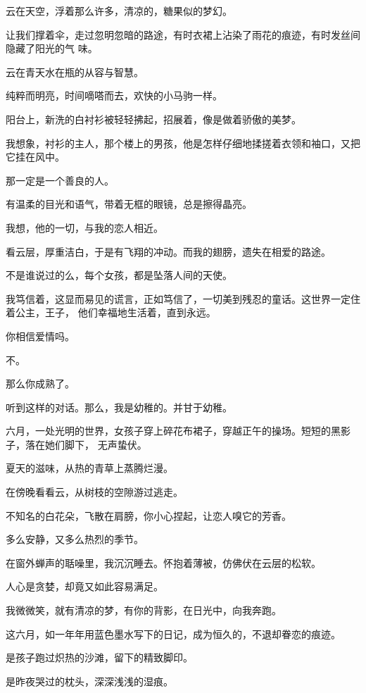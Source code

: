 		云在天空，浮着那么许多，清凉的，糖果似的梦幻。

		让我们撑着伞，走过忽明忽暗的路途，有时衣裙上沾染了雨花的痕迹，有时发丝间隐藏了阳光的气
	味。

		云在青天水在瓶的从容与智慧。

		纯粹而明亮，时间嘀嗒而去，欢快的小马驹一样。

		阳台上，新洗的白衬衫被轻轻拂起，招展着，像是做着骄傲的美梦。

		我想象，衬衫的主人，那个楼上的男孩，他是怎样仔细地揉搓着衣领和袖口，又把它挂在风中。

		那一定是一个善良的人。

		有温柔的目光和语气，带着无框的眼镜，总是擦得晶亮。

		我想，他的一切，与我的恋人相近。


		看云层，厚重洁白，于是有飞翔的冲动。而我的翅膀，遗失在相爱的路途。

		不是谁说过的么，每个女孩，都是坠落人间的天使。

		我笃信着，这显而易见的谎言，正如笃信了，一切美到残忍的童话。这世界一定住着公主，王子，
	他们幸福地生活着，直到永远。


		你相信爱情吗。

		不。

		那么你成熟了。


		听到这样的对话。那么，我是幼稚的。并甘于幼稚。

	\endwriting



		六月，一处光明的世界，女孩子穿上碎花布裙子，穿越正午的操场。短短的黑影子，落在她们脚下，
	无声蛰伏。

		夏天的滋味，从热的青草上蒸腾烂漫。\par
		在傍晚看看云，从树枝的空隙游过逃走。\par
		不知名的白花朵，飞散在肩膀，你小心捏起，让恋人嗅它的芳香。

		多么安静，又多么热烈的季节。

		在窗外蝉声的聒噪里，我沉沉睡去。怀抱着薄被，仿佛伏在云层的松软。\par
		人心是贪婪，却竟又如此容易满足。\par
		我微微笑，就有清凉的梦，有你的背影，在日光中，向我奔跑。

		这六月，如一年年用蓝色墨水写下的日记，成为恒久的，不退却眷恋的痕迹。

		是孩子跑过炽热的沙滩，留下的精致脚印。\par
		是昨夜哭过的枕头，深深浅浅的湿痕。

